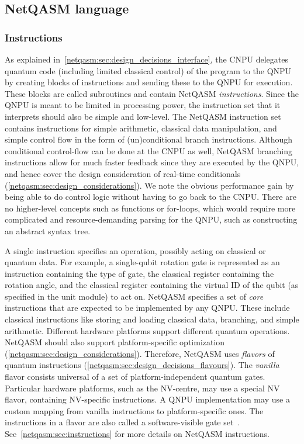 \subsection{NetQASM language}

\subsubsection{Instructions}
\label{netqasm:sec:design_decisions_language}
As explained in~\cref{netqasm:sec:design_decisions_interface}, the \ac{CNPU} delegates quantum code (including limited classical control) of the program to the \ac{QNPU} by creating blocks of instructions and sending these to the \ac{QNPU} for execution.
These blocks are called subroutines and contain \ac{NetQASM} \textit{instructions}.
Since the \ac{QNPU} is meant to be limited in processing power, the instruction set that it interprets should also be simple and low-level.
The \ac{NetQASM} instruction set contains instructions for simple arithmetic, classical data manipulation, and simple control flow in the form of (un)conditional branch instructions.
Although conditional control-flow can be done at the \ac{CNPU} as well, \ac{NetQASM} branching instructions allow for much faster feedback since they are executed by the \ac{QNPU}, and hence cover the design consideration of real-time conditionals (\cref{netqasm:sec:design_considerations}).
We note the obvious performance gain by being able to do control logic without having to go back to the \ac{CNPU}.
There are no higher-level concepts such as functions or for-loops, which would require more complicated and resource-demanding parsing for the \ac{QNPU}, such as constructing an abstract syntax tree.

A single instruction specifies an operation, possibly acting on classical or quantum data.
For example, a single-qubit rotation gate is represented as an instruction containing the type of gate, the classical register containing the rotation angle, and the classical register containing the virtual ID of the qubit (as specified in the unit module) to act on.
\ac{NetQASM} specifies a set of \textit{core} instructions that are expected to be implemented by any \ac{QNPU}.
These include classical instructions like storing and loading classical data, branching, and simple arithmetic.
Different hardware platforms support different quantum operations.
\ac{NetQASM} should also support platform-specific optimization (\cref{netqasm:sec:design_considerations}).
Therefore, \ac{NetQASM} uses \textit{flavors} of quantum instructions (\cref{netqasm:sec:design_decisions_flavours}).
The \textit{vanilla} flavor consists universal of a set of platform-independent quantum gates.
Particular hardware platforms, such as the NV-centre, may use a special NV flavor, containing NV-specific instructions.
A \ac{QNPU} implementation may use a custom mapping from vanilla instructions to platform-specific ones.
The instructions in a flavor are also called a software-visible gate set~\cite{murali2019fullstack}.
See~\cref{netqasm:sec:instructions} for more details on \ac{NetQASM} instructions.

